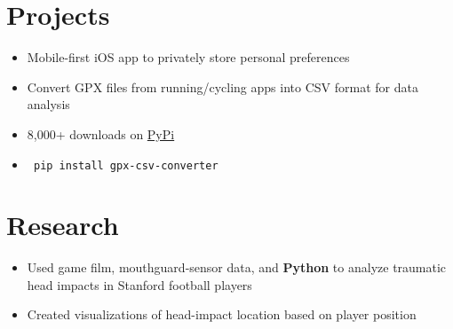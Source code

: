 \documentclass[]{houston-ethan-resume}
\begin{document}
\begin{minipage}[t]{0.66\textwidth}
	\sectionsep

\section{Projects}
	\begin{itemize}[noitemsep,topsep=0pt]
	\itemsep-0.2em 
    \item Mobile-first iOS app to privately store personal preferences
	\end{itemize}

	\sectionsep

	\begin{itemize}[noitemsep,topsep=0pt]
	\itemsep-0.2em 
	\item Convert GPX files from running/cycling apps into CSV format for data analysis
	\item 8,000+ downloads on \href{https://pypi.org/project/gpx-csv-converter/}{PyPi}
    \item \begin{verbatim} pip install gpx-csv-converter \end{verbatim}
	\end{itemize}

	\sectionsep


\section{Research}
	\begin{itemize}[noitemsep,topsep=0pt]
	\itemsep-0.2em 
	\item Used game film, mouthguard-sensor data, and \textbf{Python} to analyze traumatic head impacts in Stanford football players
	\item Created visualizations of head-impact location based on player position
	\end{itemize}

	\sectionsep

\end{minipage}
\end{document}
